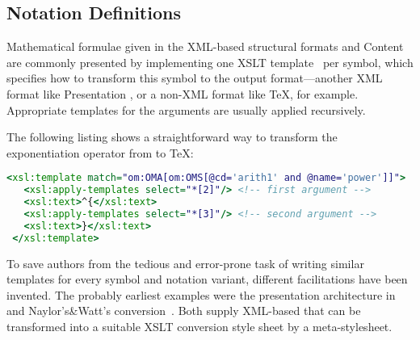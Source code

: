 \subsection{Notation Definitions}\label{sec:notdef}

Mathematical formulae given in the XML-based structural formats {\openmath} and Content
{\mathml} are commonly presented by implementing one XSLT template~\cite{W3C:xslt2} per
symbol, which specifies how to transform this symbol to the output format---another XML
format like Presentation {\mathml}, or a non-XML format like {\TeX}, for example.
Appropriate templates for the arguments are usually applied recursively.

The following listing shows a straightforward way to transform the exponentiation operator
from {\openmath} to {\TeX}:
 
\begin{lstlisting}[language=XSLT,caption=An XSLT presentation template,label=lst:template]
 <xsl:template match="om:OMA[om:OMS[@cd='arith1' and @name='power']]">
   <xsl:apply-templates select="*[2]"/> <!-- first argument -->
   <xsl:text>^{</xsl:text>
   <xsl:apply-templates select="*[3]"/> <!-- second argument -->
   <xsl:text>}</xsl:text>
 </xsl:template>
\end{lstlisting}

To save authors from the tedious and error-prone task of writing similar templates for
every symbol and notation variant, different facilitations have been invented. The
probably earliest examples were the presentation architecture in
{}~\cite{Kohlhase:otormd00} and Naylor's\&Watt's {\openmath}
conversion~\cite{Naylor:conversion}. Both supply XML-based {} that can be transformed into a suitable XSLT conversion style sheet by a
meta-stylesheet.

